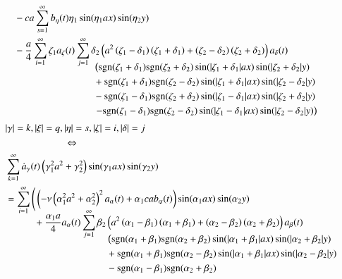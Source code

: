 \begin{refsection}
\begin{align*}
&\phantom{={}}
-
ca
\sum_{s = 1}^{\infty}
b_{\eta}(t)
\eta_1
\sin(\eta_1 ax) \sin(\eta_2 y)
\\
&\phantom{={}}
-
\frac{a}{4}
\sum_{i = 1}^{\infty}
\zeta_1
a_{\zeta}(t)
\sum_{j = 1}^{\infty}
\delta_2
\left(
a^2 \left(\zeta_1 - \delta_1 \right)\left( \zeta_1 + \delta_1 \right)
+ \left(\zeta_2 - \delta_2 \right)\left( \zeta_2 + \delta_2 \right)
\right)
a_{\delta}(t)
\\[-2.5ex]
&\phantom{=-abbbbb\sum\sum.....{}}
\left(
\sgn(\zeta_1 + \delta_1)\sgn(\zeta_2 + \delta_2)
\sin(|\zeta_1 + \delta_1|ax)\sin(|\zeta_2 + \delta_2|y)
\right.
\\[-1.0ex]
&\phantom{=-abbbbb\sum\sum.....{}}
+
\sgn(\zeta_1 + \delta_1)\sgn(\zeta_2 - \delta_2)
\sin(|\zeta_1 + \delta_1|ax)\sin(|\zeta_2 - \delta_2|y)
\\[-1.0ex]
&\phantom{=-abbbbb\sum\sum.....{}}
-
\sgn(\zeta_1 - \delta_1)\sgn(\zeta_2 + \delta_2)
\sin(|\zeta_1 - \delta_1|ax)\sin(|\zeta_2 + \delta_2|y)
\\[-1.0ex]
&\phantom{=-abbbbb\sum\sum.....{}}
\left.
-
\sgn(\zeta_1 - \delta_1)\sgn(\zeta_2 - \delta_2)
\sin(|\zeta_1 - \delta_1|ax)\sin(|\zeta_2 - \delta_2|y)
\right)
\\
&|\gamma| = k, |\xi| = q, |\eta| = s, |\zeta| = i, |\delta| = j
\\
&\qquad \qquad \qquad \Leftrightarrow
\\
&
\sum_{k = 1}^{\infty}
\dot{a}_{\gamma}(t)
\left(\gamma_1^2 a^2 + \gamma_2^2\right)
\sin(\gamma_1 ax) \sin(\gamma_2 y)
\\
&=
\sum_{i = 1}^{\infty}
\Bigg(
\left(
-\nu
\left(\alpha_1^2 a^2+\alpha_2^2\right)^2
a_{\alpha}(t)
+
\alpha_1 c a
b_{\alpha}(t)
\right)
\sin(\alpha_1 ax) \sin(\alpha_2 y)
\\[-2ex]
&\phantom{=bbbb}
+
\frac{\alpha_1 a}{4}
a_{\alpha}(t)
\sum_{j = 1}^{\infty}
\beta_2
\left(
a^2 \left(\alpha_1 - \beta_1 \right)\left(\alpha_1 + \beta_1 \right)
+ \left(\alpha_2 - \beta_2 \right)\left(\alpha_2 + \beta_2 \right)
\right)
a_{\beta}(t)
\\[-2.5ex]
&\phantom{=bb-4paatabb\sum\sum.{}}
\left(
\sgn(\alpha_1 + \beta_1)\sgn(\alpha_2 + \beta_2)
\sin(|\alpha_1 + \beta_1|ax)\sin(|\alpha_2 + \beta_2|y)
\right.
\\[-1.0ex]
&\phantom{=bb-4paatabb\sum\sum.{}}
+
\sgn(\alpha_1 + \beta_1)\sgn(\alpha_2 - \beta_2)
\sin(|\alpha_1 + \beta_1|ax)\sin(|\alpha_2 - \beta_2|y)
\\[-1.0ex]
&\phantom{=bb-4paatabb\sum\sum.{}}
-
\sgn(\alpha_1 - \beta_1)\sgn(\alpha_2 + \beta_2)

\end{align*}
\end{refsection}
